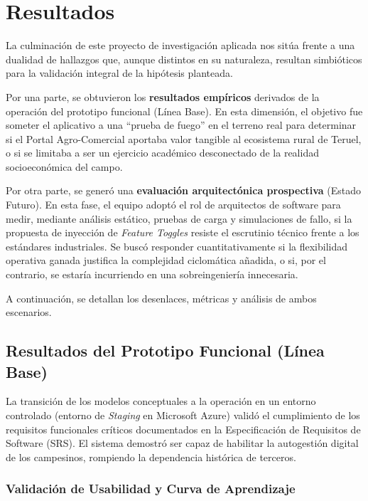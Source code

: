\section{Resultados}

La culminación de este proyecto de investigación aplicada nos sitúa frente a una dualidad de hallazgos que, aunque distintos en su naturaleza, resultan simbióticos para la validación integral de la hipótesis planteada.

Por una parte, se obtuvieron los \textbf{resultados empíricos} derivados de la operación del prototipo funcional (Línea Base). En esta dimensión, el objetivo fue someter el aplicativo a una ``prueba de fuego'' en el terreno real para determinar si el Portal Agro-Comercial aportaba valor tangible al ecosistema rural de Teruel, o si se limitaba a ser un ejercicio académico desconectado de la realidad socioeconómica del campo.

Por otra parte, se generó una \textbf{evaluación arquitectónica prospectiva} (Estado Futuro). En esta fase, el equipo adoptó el rol de arquitectos de software para medir, mediante análisis estático, pruebas de carga y simulaciones de fallo, si la propuesta de inyección de \textit{Feature Toggles} resiste el escrutinio técnico frente a los estándares industriales. Se buscó responder cuantitativamente si la flexibilidad operativa ganada justifica la complejidad ciclomática añadida, o si, por el contrario, se estaría incurriendo en una sobreingeniería innecesaria.

A continuación, se detallan los desenlaces, métricas y análisis de ambos escenarios.

\subsection{Resultados del Prototipo Funcional (Línea Base)}

La transición de los modelos conceptuales a la operación en un entorno controlado (entorno de \textit{Staging} en Microsoft Azure) validó el cumplimiento de los requisitos funcionales críticos documentados en la Especificación de Requisitos de Software (SRS). El sistema demostró ser capaz de habilitar la autogestión digital de los campesinos, rompiendo la dependencia histórica de terceros.

\subsubsection{Validación de Usabilidad y Curva de Aprendizaje}

